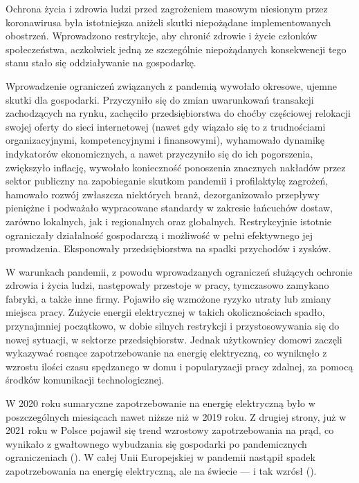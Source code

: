 \documentclass[polish, twoside, 12pt, a4paper]{article}
\theoremstyle{definition}
\theoremstyle{plain}
\theoremstyle{remark}
\begin{document}
Ochrona życia i zdrowia ludzi przed zagrożeniem masowym niesionym przez koronawirusa była istotniejsza aniżeli skutki niepożądane implementowanych obostrzeń. Wprowadzono restrykcje, aby chronić zdrowie i życie członków społeczeństwa, aczkolwiek jedną ze szczególnie niepożądanych konsekwencji tego stanu stało się oddziaływanie na gospodarkę.  

Wprowadzenie ograniczeń związanych z pandemią wywołało okresowe, ujemne skutki dla gospodarki. Przyczyniło się do zmian uwarunkowań transakcji zachodzących na rynku, zachęciło przedsiębiorstwa do choćby częściowej relokacji swojej oferty do sieci internetowej (nawet gdy wiązało się to z trudnościami organizacyjnymi, kompetencyjnymi i finansowymi), wyhamowało dynamikę indykatorów ekonomicznych, a nawet przyczyniło się do ich pogorszenia, zwiększyło inflację, wywołało konieczność ponoszenia znacznych nakładów przez sektor publiczny na zapobieganie skutkom pandemii i profilaktykę zagrożeń, hamowało rozwój zwłaszcza niektórych branż, dezorganizowało przepływy pieniężne i podważało wypracowane standardy w zakresie łańcuchów dostaw, zarówno lokalnych, jak i regionalnych oraz globalnych. Restrykcyjnie istotnie ograniczały działalność gospodarczą i możliwość w pełni efektywnego jej prowadzenia. Eksponowały przedsiębiorstwa na spadki przychodów i zysków. 

W warunkach pandemii, z powodu wprowadzanych ograniczeń służących ochronie zdrowia i życia ludzi, następowały przestoje w pracy, tymczasowo zamykano fabryki, a także inne firmy. Pojawiło się wzmożone ryzyko utraty lub zmiany miejsca pracy. Zużycie energii elektrycznej w takich okolicznościach spadło, przynajmniej początkowo, w dobie silnych restrykcji i przystosowywania się do nowej sytuacji, w sektorze przedsiębiorstw. Jednak użytkownicy domowi zaczęli wykazywać rosnące zapotrzebowanie na energię elektryczną, co wyniknęło z wzrostu ilości czasu spędzanego w domu i popularyzacji pracy zdalnej, za pomocą środków komunikacji technologicznej. 

W 2020 roku sumaryczne zapotrzebowanie na energię elektryczną było w poszczególnych miesiącach nawet niższe niż w 2019 roku. Z drugiej strony, już w 2021 roku w Polsce pojawił się trend wzrostowy zapotrzebowania na prąd, co wynikało z gwałtownego wybudzania się gospodarki po pandemicznych ograniczeniach (\cite{smyk2021}). W całej Unii Europejskiej w pandemii nastąpił spadek zapotrzebowania na energię elektryczną, ale na świecie --- i tak wzrósł (\cite{maciuch2023}). 
\end{document}
